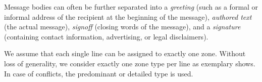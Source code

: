 \documentclass{llncs}
\begin{document}
Message bodies can often be further separated into a \textit{greeting} (such as a formal or informal address of the recipient at the beginning of the message), \textit{authored text} (the actual message), \textit{signoff} (closing words of the message), and a \textit{signature} (containing contact information, advertising, or legal disclaimers).

We assume that each single line can be assigned to exactly one zone.
Without loss of generality, we consider exactly one zone type per line as  exemplary shows.
In case of conflicts, the predominant or detailed type is used.


\end{document}
